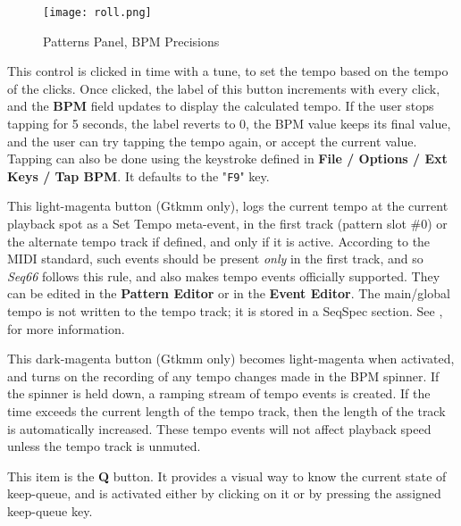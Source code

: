 \begin{figure}[H]
   \centering 
   \texttt{[image: roll.png]}
   \caption{Patterns Panel, BPM Precisions}
   \label{fig:pattern_window_bpm_precision_settings.png}
\end{figure}

   This control is clicked in time with a tune, to set the
   tempo based on the tempo of the clicks.  Once clicked, the label of this
   button increments with every click, and the \textbf{BPM} field updates to
   display the calculated tempo.  If the user stops tapping for 5 seconds, the
   label reverts to 0, the BPM value keeps its final value, and the user can
   try tapping the tempo again, or accept the current value.
   Tapping can also be done using the keystroke defined
   in \textbf{File / Options / Ext Keys / Tap BPM}.
   It defaults to the "\texttt{F9}" key.

   This light-magenta button (Gtkmm only),
   logs the current tempo at the
   current playback spot as a Set Tempo meta-event, in the first
   track (pattern slot \#0) or the alternate tempo track if defined,
   and only if it is active.  According to the MIDI standard, such events
   should be present \textsl{only} in the first track,
   and so \textsl{Seq66} follows this rule, and also makes tempo events
   officially supported.  They can be edited in the 
   \textbf{Pattern Editor} or in the
   \textbf{Event Editor}.
   The main/global tempo is not written to the tempo track; it is stored in
   a SeqSpec section.
   See , for more information.

   This dark-magenta button (Gtkmm only)
   becomes light-magenta when activated, and turns on
   the recording of any tempo changes made in the BPM spinner.  If the spinner
   is held down, a ramping stream of tempo events is created.  If
   the time exceeds the current length of the tempo track, then the length of
   the track is automatically increased.
   These tempo events will not affect playback speed
   unless the tempo track is unmuted.

   This item is the \textbf{Q} button.
   It provides a visual way to know the current state of keep-queue, and is
   activated either by clicking on it or by pressing the assigned keep-queue
   key.

